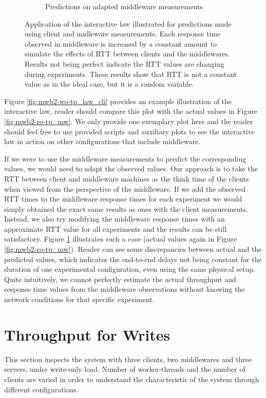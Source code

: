 \documentclass[11pt,a4paper]{article}
\begin{document}
\begin{figure}[h!]
\begin{subfigure}{.5\textwidth}
  \caption{Predictions on adapted middleware measurements}
  \label{fig:mwb2-wo-tp_law_mw}
\end{subfigure}
\caption{Application of the interactive law illustrated for predictions made using client and midleware measurements. Each response time observed in middleware is increased by a constant amount to simulate the effects of RTT between clients and the middlewares. Results not being perfect indicate the RTT values are changing during experiments. These results show that RTT is not a constant value as in the ideal case, but it is a random variable.}
\label{fig:mwb2-wo-tp_law}
\end{figure}
\par Figure \ref{fig:mwb2-wo-tp_law_cli} provides an example illustration of the interactive law, reader should compare this plot with the actual values in Figure \ref{fig:mwb2-ro-tp_mw}. We only provide one exemplary plot here and the reader should feel free to use provided scripts and auxiliary plots to see the interactive law in action on other configurations that include middleware.
\par If we were to use the middleware measurements to predict the corresponding values, we would need to adapt the observed values. Our approach is to take the RTT between client and middleware machines as the think time of the clients when viewed from the perspective of the middleware. If we add the observed RTT times to the middleware response times for each experiment we would simply obtained the exact same results as ones with the client measurements. Instead, we also try modifying the middleware response times with an approximate RTT value for all experiments and the results can be still satisfactory. Figure \ref{fig:mwb2-wo-tp_law_mw} illustrates such a case (actual values again in Figure \ref{fig:mwb2-ro-tp_mw}). Reader can see some discrepancies between actual and the predicted values, which indicates the end-to-end delays not being constant for the duration of one experimental configuration, even using the same physical setup. Quite intuitively, we cannot perfectly estimate the actual throughput and response time values from the middleware observations without knowing the network conditions for that specific experiment.

\section{Throughput for Writes} \label{sec:tpfw}
This section inspects the system with three clients, two middlewares and three servers, under write-only load. Number of worker-threads and the number of clients are varied in order to understand the characteristic of the system through different configurations.
\end{document}
